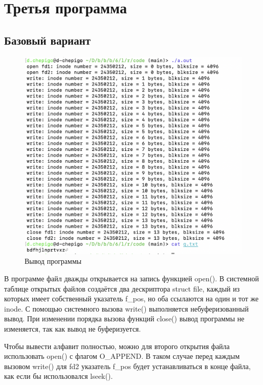 \section{Третья программа}
\subsection{Базовый вариант}

\begin{figure}[!hbpt]
	\centering
	\includegraphics[width=\textwidth]{image/3-1}
	\caption{Вывод программы}
\end{figure}
В программе файл дважды открывается на запись функцией open(). В системной таблице открытых файлов создаётся два дескриптора struct file, каждый из которых имеет собственный указатель f\_pos, но оба ссылаются на один и тот же inode. С помощью системного вызова write() выполняется небуферизованный вывод. При изменении порядка вызова функций close() вывод программы не изменяется, так как вывод не буферизуется.

Чтобы вывести алфавит полностью, можно для второго открытия файла использовать open() с флагом O\_APPEND. В таком случае перед каждым вызовом write() для fd2 указатель f\_pos будет устанавливаться в конце файла, как если бы использовался lseek().

